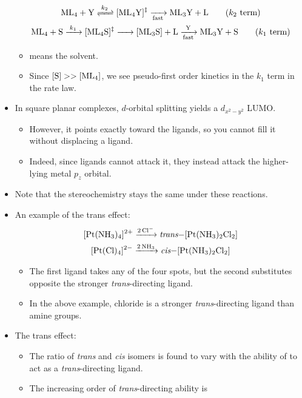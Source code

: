 \documentclass[../notes.tex]{subfiles}
\begin{document}
\begin{itemize}
    \begin{gather*}
        \ce{ML4 + Y <=>[$k_2$] [ML4Y]^{$\ddagger$} ->[][fast] ML3Y + L}\tag{$k_2$ term}\\
        \ce{ML4 + S ->[$k_1$] [ML4S]^{$\ddagger$} -> [ML3S] + L ->[Y][fast] ML3Y + S}\tag{$k_1$ term}
    \end{gather*}
    \begin{itemize}
        \item {} means the solvent.
        \item Since $\ce{[S]}>>\ce{[ML4]}$, we see pseudo-first order kinetics in the $k_1$ term in the rate law.
    \end{itemize}
    \item In square planar complexes, $d$-orbital splitting yields a $d_{x^2-y^2}$ LUMO.
    \begin{itemize}
        \item However, it points exactly toward the ligands, so you cannot fill it without displacing a ligand.
        \item Indeed, since ligands cannot attack it, they instead attack the higher-lying metal $p_z$ orbital.
    \end{itemize}
    \item Note that the stereochemistry stays the same under these reactions.
    \item An example of the trans effect:
    \begin{gather*}
        \ce{[Pt(NH3)4]^2+ ->[2Cl-] \emph{trans}-[Pt(NH3)2Cl2]}\\
        \ce{[Pt(Cl)4]^2- ->[2NH3] \emph{cis}-[Pt(NH3)2Cl2]}
    \end{gather*}
    \begin{itemize}
        \item The first ligand takes any of the four spots, but the second substitutes opposite the stronger \emph{trans}-directing ligand.
        \item In the above example, chloride is a stronger \emph{trans}-directing ligand than amine groups.
    \end{itemize}
    \item The trans effect:
    \begin{itemize}
        \item The ratio of \emph{trans} and \emph{cis} isomers is found to vary with the ability of  to act as a \emph{trans}-directing ligand.
        \item The increasing order of \emph{trans}-directing ability is

\end{itemize}
\end{itemize}
\end{document}
